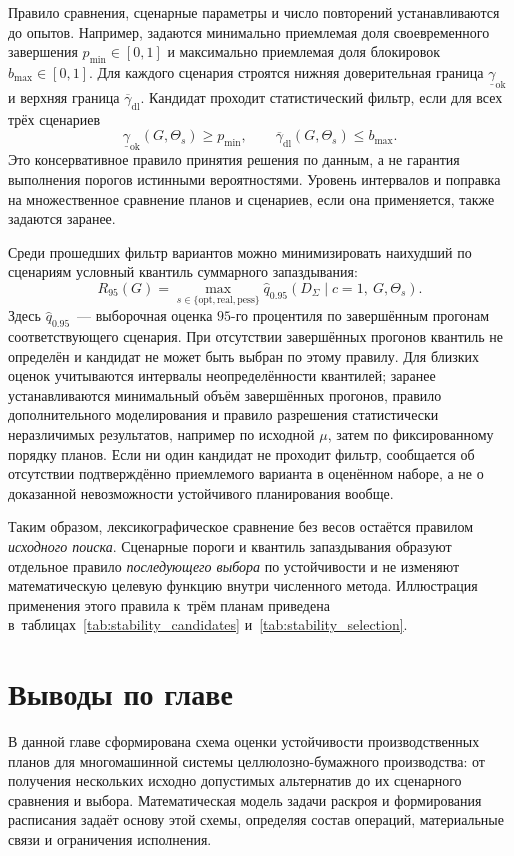 Правило сравнения, сценарные параметры и число повторений устанавливаются до опытов. Например, задаются минимально приемлемая доля своевременного завершения $p_{\min}\in[0,1]$ и максимально приемлемая доля блокировок $b_{\max}\in[0,1]$. Для каждого сценария строятся нижняя доверительная граница $\underline{\gamma}_{\mathrm{ok}}$ и верхняя граница $\overline{\gamma}_{\mathrm{dl}}$. Кандидат проходит статистический фильтр, если для всех трёх сценариев
\[
\underline{\gamma}_{\mathrm{ok}}(G,\Theta_s)\geq p_{\min},\qquad
\overline{\gamma}_{\mathrm{dl}}(G,\Theta_s)\leq b_{\max}.
\]
Это консервативное правило принятия решения по данным, а не гарантия выполнения порогов истинными вероятностями. Уровень интервалов и поправка на множественное сравнение планов и сценариев, если она применяется, также задаются заранее.

Среди прошедших фильтр вариантов можно минимизировать наихудший по сценариям условный квантиль суммарного запаздывания:
\[
R_{95}(G)=\max_{s\in\{\mathrm{opt},\mathrm{real},\mathrm{pess}\}}
\widehat{q}_{0.95}\!\left(D_{\Sigma}\mid c=1,\ G,\Theta_s\right).
\]
Здесь $\widehat{q}_{0.95}$~--- выборочная оценка $95$-го процентиля по завершённым прогонам соответствующего сценария. При отсутствии завершённых прогонов квантиль не определён и кандидат не может быть выбран по этому правилу. Для близких оценок учитываются интервалы неопределённости квантилей; заранее устанавливаются минимальный объём завершённых прогонов, правило дополнительного моделирования и правило разрешения статистически неразличимых результатов, например по исходной $\mu$, затем по фиксированному порядку планов. Если ни один кандидат не проходит фильтр, сообщается об отсутствии подтверждённо приемлемого варианта в оценённом наборе, а не о доказанной невозможности устойчивого планирования вообще.

Таким образом, лексикографическое сравнение без весов остаётся правилом \emph{исходного поиска}. Сценарные пороги и квантиль запаздывания образуют отдельное правило \emph{последующего выбора} по устойчивости и не изменяют математическую целевую функцию внутри численного метода. Иллюстрация применения этого правила к~трём планам приведена в~таблицах~\ref{tab:stability_candidates} и~\ref{tab:stability_selection}.

\section{Выводы по главе}\label{sec:model/statement_conclusion}
В данной главе сформирована схема оценки устойчивости производственных планов для многомашинной системы целлюлозно-бумажного производства: от получения нескольких исходно допустимых альтернатив до их сценарного сравнения и выбора. Математическая модель задачи раскроя и формирования расписания задаёт основу этой схемы, определяя состав операций, материальные связи и ограничения исполнения.

